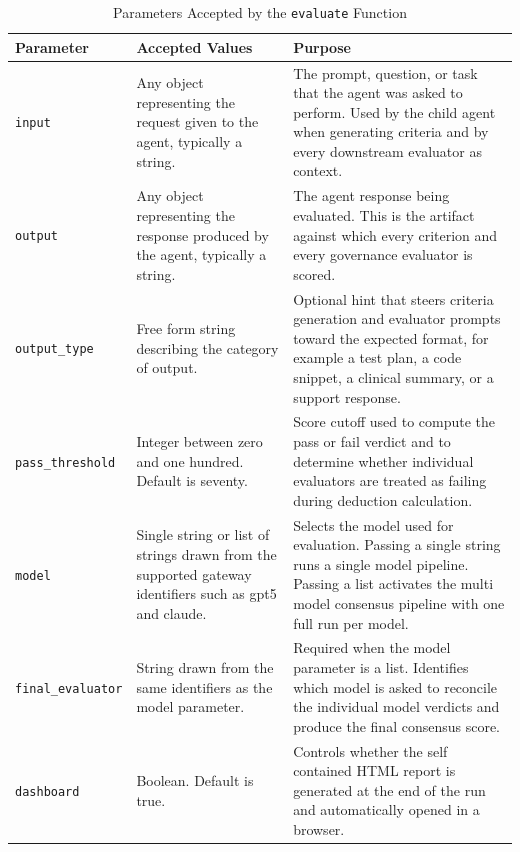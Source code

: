 \documentclass[12pt, a4paper, oneside]{report}
\begin{document}
\begin{table}[h]
\centering
\caption{Parameters Accepted by the \texttt{evaluate} Function}
\label{tab:sdk-params}
\begin{tabular}{|p{4cm}|p{4.3cm}|p{6.2cm}|}
\hline
\textbf{Parameter} & \textbf{Accepted Values} & \textbf{Purpose} \\
\hline

\texttt{input} &
Any object representing the request given to the agent, typically a string. &
The prompt, question, or task that the agent was asked to perform. Used by the child agent when generating criteria and by every downstream evaluator as context.
\\
\hline

\texttt{output} &
Any object representing the response produced by the agent, typically a string. &
The agent response being evaluated. This is the artifact against which every criterion and every governance evaluator is scored.
\\
\hline

\texttt{output\_type} &
Free form string describing the category of output. &
Optional hint that steers criteria generation and evaluator prompts toward the expected format, for example a test plan, a code snippet, a clinical summary, or a support response.
\\
\hline

\texttt{pass\_threshold} &
Integer between zero and one hundred. Default is seventy. &
Score cutoff used to compute the pass or fail verdict and to determine whether individual evaluators are treated as failing during deduction calculation.
\\
\hline

\texttt{model} &
Single string or list of strings drawn from the supported gateway identifiers such as gpt5 and claude. &
Selects the model used for evaluation. Passing a single string runs a single model pipeline. Passing a list activates the multi model consensus pipeline with one full run per model.
\\
\hline

\texttt{final\_evaluator} &
String drawn from the same identifiers as the model parameter. &
Required when the model parameter is a list. Identifies which model is asked to reconcile the individual model verdicts and produce the final consensus score.
\\
\hline

\texttt{dashboard} &
Boolean. Default is true. &
Controls whether the self contained HTML report is generated at the end of the run and automatically opened in a browser.
\\
\hline


\end{tabular}
\end{table}
\end{document}
